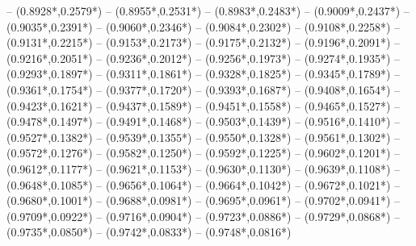 {	-- ({0.8928*\dx},{0.2579*\dy})
	-- ({0.8955*\dx},{0.2531*\dy})
	-- ({0.8983*\dx},{0.2483*\dy})
	-- ({0.9009*\dx},{0.2437*\dy})
	-- ({0.9035*\dx},{0.2391*\dy})
	-- ({0.9060*\dx},{0.2346*\dy})
	-- ({0.9084*\dx},{0.2302*\dy})
	-- ({0.9108*\dx},{0.2258*\dy})
	-- ({0.9131*\dx},{0.2215*\dy})
	-- ({0.9153*\dx},{0.2173*\dy})
	-- ({0.9175*\dx},{0.2132*\dy})
	-- ({0.9196*\dx},{0.2091*\dy})
	-- ({0.9216*\dx},{0.2051*\dy})
	-- ({0.9236*\dx},{0.2012*\dy})
	-- ({0.9256*\dx},{0.1973*\dy})
	-- ({0.9274*\dx},{0.1935*\dy})
	-- ({0.9293*\dx},{0.1897*\dy})
	-- ({0.9311*\dx},{0.1861*\dy})
	-- ({0.9328*\dx},{0.1825*\dy})
	-- ({0.9345*\dx},{0.1789*\dy})
	-- ({0.9361*\dx},{0.1754*\dy})
	-- ({0.9377*\dx},{0.1720*\dy})
	-- ({0.9393*\dx},{0.1687*\dy})
	-- ({0.9408*\dx},{0.1654*\dy})
	-- ({0.9423*\dx},{0.1621*\dy})
	-- ({0.9437*\dx},{0.1589*\dy})
	-- ({0.9451*\dx},{0.1558*\dy})
	-- ({0.9465*\dx},{0.1527*\dy})
	-- ({0.9478*\dx},{0.1497*\dy})
	-- ({0.9491*\dx},{0.1468*\dy})
	-- ({0.9503*\dx},{0.1439*\dy})
	-- ({0.9516*\dx},{0.1410*\dy})
	-- ({0.9527*\dx},{0.1382*\dy})
	-- ({0.9539*\dx},{0.1355*\dy})
	-- ({0.9550*\dx},{0.1328*\dy})
	-- ({0.9561*\dx},{0.1302*\dy})
	-- ({0.9572*\dx},{0.1276*\dy})
	-- ({0.9582*\dx},{0.1250*\dy})
	-- ({0.9592*\dx},{0.1225*\dy})
	-- ({0.9602*\dx},{0.1201*\dy})
	-- ({0.9612*\dx},{0.1177*\dy})
	-- ({0.9621*\dx},{0.1153*\dy})
	-- ({0.9630*\dx},{0.1130*\dy})
	-- ({0.9639*\dx},{0.1108*\dy})
	-- ({0.9648*\dx},{0.1085*\dy})
	-- ({0.9656*\dx},{0.1064*\dy})
	-- ({0.9664*\dx},{0.1042*\dy})
	-- ({0.9672*\dx},{0.1021*\dy})
	-- ({0.9680*\dx},{0.1001*\dy})
	-- ({0.9688*\dx},{0.0981*\dy})
	-- ({0.9695*\dx},{0.0961*\dy})
	-- ({0.9702*\dx},{0.0941*\dy})
	-- ({0.9709*\dx},{0.0922*\dy})
	-- ({0.9716*\dx},{0.0904*\dy})
	-- ({0.9723*\dx},{0.0886*\dy})
	-- ({0.9729*\dx},{0.0868*\dy})
	-- ({0.9735*\dx},{0.0850*\dy})
	-- ({0.9742*\dx},{0.0833*\dy})
	-- ({0.9748*\dx},{0.0816*\dy})
}
